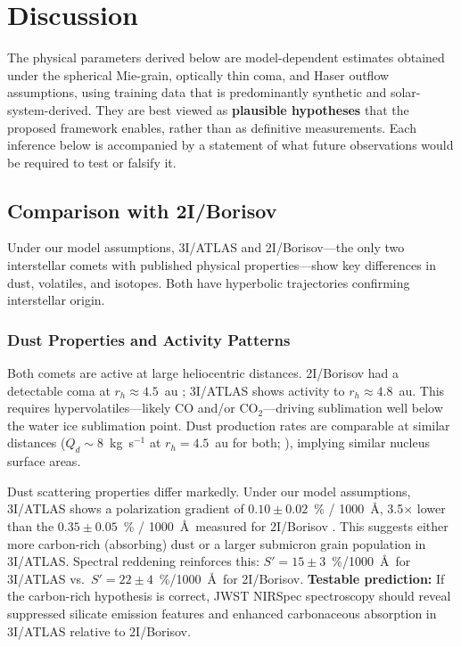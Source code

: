 \documentclass[preprint2]{aastex631}
\begin{document}
\section{Discussion}\label{sec:discussion}

The physical parameters derived below are model-dependent estimates obtained under the spherical Mie-grain, optically thin coma, and Haser outflow assumptions, using training data that is predominantly synthetic and solar-system-derived. They are best viewed as \textbf{plausible hypotheses} that the proposed framework enables, rather than as definitive measurements. Each inference below is accompanied by a statement of what future observations would be required to test or falsify it.

\subsection{Comparison with 2I/Borisov}

Under our model assumptions, 3I/ATLAS and 2I/Borisov---the only two interstellar comets with published physical properties---show key differences in dust, volatiles, and isotopes. Both have hyperbolic trajectories confirming interstellar origin.

\subsubsection{Dust Properties and Activity Patterns}

Both comets are active at large heliocentric distances. 2I/Borisov had a detectable coma at $r_h \approx 4.5$~au \citep{jewitt19}; 3I/ATLAS shows activity to $r_h \approx 4.8$~au. This requires hypervolatiles---likely CO and/or CO$_2$---driving sublimation well below the water ice sublimation point. Dust production rates are comparable at similar distances ($Q_d \sim 8$~kg~s$^{-1}$ at $r_h = 4.5$~au for both; \citealt{clements21}), implying similar nucleus surface areas.

Dust scattering properties differ markedly. Under our model assumptions, 3I/ATLAS shows a polarization gradient of $0.10 \pm 0.02$~\% / 1000~\AA, 3.5$\times$ lower than the $0.35 \pm 0.05$~\% / 1000~\AA\ measured for 2I/Borisov \citep{bagnulo22}. This suggests either more carbon-rich (absorbing) dust or a larger submicron grain population in 3I/ATLAS. Spectral reddening reinforces this: $S' = 15 \pm 3$~\%/1000~\AA\ for 3I/ATLAS vs.\ $S' = 22 \pm 4$~\%/1000~\AA\ for 2I/Borisov. \textbf{Testable prediction:} If the carbon-rich hypothesis is correct, JWST NIRSpec spectroscopy should reveal suppressed silicate emission features and enhanced carbonaceous absorption in 3I/ATLAS relative to 2I/Borisov.
\end{document}
